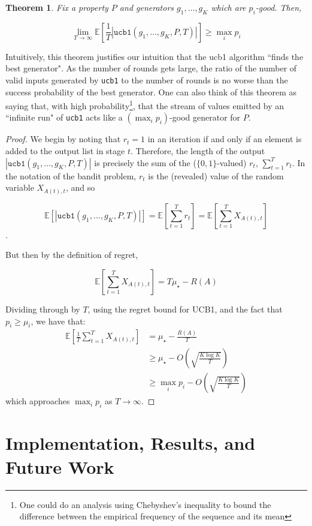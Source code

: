 \documentclass[10pt,a4paper]{article}
\newtheorem{theorem}{Theorem}
\begin{document}
\begin{theorem}
Fix a property $P$ and generators $g_1,\dots,g_K$ which are $p_i$-good. Then,

$$
\lim_{T \to \infty} \mathbb{E}\left[\frac{1}{T}\left|\texttt{ucb1}(g_1,\dots,g_K,P,T)\right|\right] \geq \max_i p_i
$$
\end{theorem}
Intuitively, this theorem justifies our intuition that the ucb1 algorithm ``finds the best generator". As the number of rounds gets large, the ratio of the number of valid inputs generated by \texttt{ucb1} to the number of rounds is no worse than the success probability of the best generator. One can also think of this theorem as saying that, with high probability\footnote{One could do an analysis using Chebyshev's inequality to bound the difference between the empirical frequency of the sequence and its mean}, that the stream of values emitted by an ``infinite run" of \texttt{ucb1} acts like a $(\max_i p_i)$-good generator for $P$.
\begin{proof}
We begin by noting that $r_t = 1$ in an iteration if and only if an element is added to the output list in stage $t$. Therefore, the length of the output $\left|\texttt{ucb1}(g_1,\dots,g_K,P,T)\right|$ is precisely the sum of the ($\{0,1\}$-valued) $r_t$, $\sum_{t=1}^T r_t$. In the notation of the bandit problem, $r_t$ is the (revealed) value of the random variable $X_{A(t),t}$, and so 

$$\mathbb{E}\left[\left|\texttt{ucb1}(g_1,\dots,g_K,P,T)\right|\right] = \mathbb{E}\left[\sum_{t=1}^T r_t\right] = \mathbb{E}\left[\sum_{t=1}^T X_{A(t),t}\right]$$.

But then by the definition of regret,

$$
\mathbb{E}\left[\sum_{t=1}^T X_{A(t),t}\right] = T\mu_{\star} - R(A)
$$

Dividing through by $T$, using the regret bound for UCB1, and the fact that $p_i \geq \mu_i$, we have that:
\begin{align*}
\mathbb{E}\left[\frac{1}{T}\sum_{t=1}^T X_{A(t),t}\right] &= \mu_\star - \frac{R(A)}{T}\\
&\geq \mu_{\star} - O\left(\sqrt{\frac{K\log K}{T}}\right)\\
&\geq \max_i p_i - O\left(\sqrt{\frac{K\log K}{T}}\right)
\end{align*}
which approaches $\max_i p_i$ as $T \to \infty$.
\end{proof}

\section{Implementation, Results, and Future Work}
\label{sec:impl}
\end{document}
